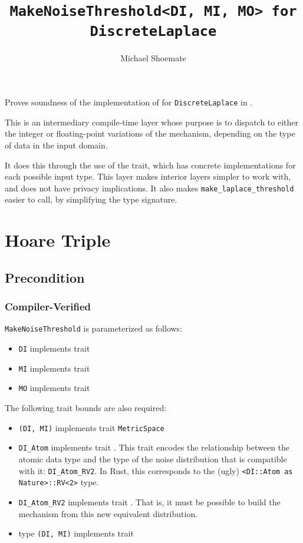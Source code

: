 \documentclass{article}
\title{\texttt{MakeNoiseThreshold<DI, MI, MO> for DiscreteLaplace}}
\author{Michael Shoemate}
\date{}
\begin{document}
\maketitle

\contrib
Proves soundness of the implementation of  
for \texttt{DiscreteLaplace} in .

This is an intermediary compile-time layer whose purpose is 
to dispatch to either the integer or floating-point variations of the mechanism,
depending on the type of data in the input domain.

It does this through the use of the  trait,
which has concrete implementations for each possible input type.
This layer makes interior layers simpler to work with, and does not have privacy implications.
It also makes \texttt{make\_laplace\_threshold} easier to call,
by simplifying the type signature.

\section{Hoare Triple}
\subsection*{Precondition}
\subsubsection*{Compiler-Verified}
\texttt{MakeNoiseThreshold} is parameterized as follows:
\begin{itemize}
    \item \texttt{DI} implements trait 
    \item \texttt{MI} implements trait 
    \item \texttt{MO} implements trait 
\end{itemize}

The following trait bounds are also required:
\begin{itemize}
    \item \texttt{(DI, MI)} implements trait \texttt{MetricSpace}
    \item \texttt{DI\_Atom} implements trait .
        This trait encodes the relationship between the atomic data type 
        and the type of the noise distribution that is compatible with it: \texttt{DI\_Atom\_RV2}.
        In Rust, this corresponds to the (ugly) \texttt{<DI::Atom as Nature>::RV<2>} type.
    \item \texttt{DI\_Atom\_RV2} implements trait .
        That is, it must be possible to build the mechanism from this new equivalent distribution.
    \item type \texttt{(DI, MI)} implements trait 
\end{itemize}
\end{document}
